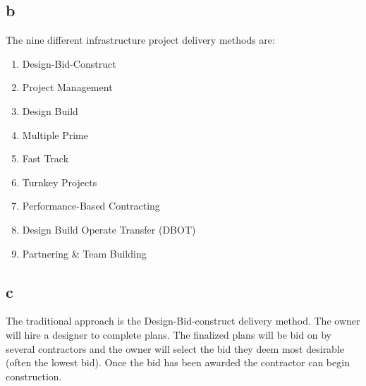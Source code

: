 \documentclass[12pt]{article} %
\begin{document}
	\subsection{b}
		The nine different infrastructure project delivery methods are:
		\begin{enumerate}
			\item Design-Bid-Construct
			\item Project Management
			\item Design Build
			\item Multiple Prime
			\item Fast Track
			\item Turnkey Projects
			\item Performance-Based Contracting
			\item Design Build Operate Transfer (DBOT)
			\item Partnering \& Team Building
		\end{enumerate}
		
	\subsection{c}
		The traditional approach is the Design-Bid-construct delivery method. The owner will hire a designer to complete plans. The finalized plans will be bid on by several contractors and the owner will select the bid they deem most desirable (often the lowest bid). Once the bid has been awarded the contractor can begin construction.
		
\end{document}
